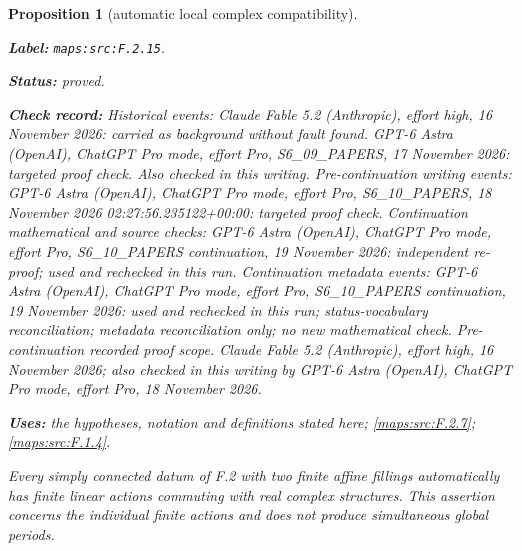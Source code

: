 \documentclass[11pt,a4paper]{article}
\newtheorem{proposition}[proposition]{Proposition}
\theoremstyle{definition}
\newcommand{\StatementRecord}[4]{\par\smallskip\begingroup\upshape\raggedright\noindent\textbf{Label:} \nolinkurl{#1}.\par\noindent\textbf{Status:} #2.\par\noindent\textbf{Check record:} #3.\par\noindent\textbf{Uses:} #4.\par\endgroup\smallskip}
\begin{document}
\begin{proposition}[automatic local complex compatibility]\label{maps:src:F.2.15}
\StatementRecord{maps:src:F.2.15}{proved}{Historical events: Claude Fable 5.2 (Anthropic), effort high, 16 November 2026: carried as background without fault found. GPT-6 Astra (OpenAI), ChatGPT Pro mode, effort Pro, S6\_09\_PAPERS, 17 November 2026: targeted proof check. Also checked in this writing. Pre-continuation writing events: GPT-6 Astra (OpenAI), ChatGPT Pro mode, effort Pro, S6\_10\_PAPERS, 18 November 2026 02:27:56.235122+00:00: targeted proof check. Continuation mathematical and source checks: GPT-6 Astra (OpenAI), ChatGPT Pro mode, effort Pro, S6\_10\_PAPERS continuation, 19 November 2026: independent re-proof; used and rechecked in this run. Continuation metadata events: GPT-6 Astra (OpenAI), ChatGPT Pro mode, effort Pro, S6\_10\_PAPERS continuation, 19 November 2026: used and rechecked in this run; status-vocabulary reconciliation; metadata reconciliation only; no new mathematical check. \emph{Pre-continuation recorded proof scope.} Claude Fable 5.2 (Anthropic), effort high, 16 November 2026; also checked in this writing by GPT-6 Astra (OpenAI), ChatGPT Pro mode, effort Pro, 18 November 2026}{the hypotheses, notation and definitions stated here; \cref{maps:src:F.2.7}; \cref{maps:src:F.1.4}}


Every simply connected datum of F.2 with two finite affine
fillings automatically has finite linear actions commuting
with real complex structures.  This assertion concerns the
individual finite actions and does not produce simultaneous
global periods.

\end{proposition}
\end{document}
